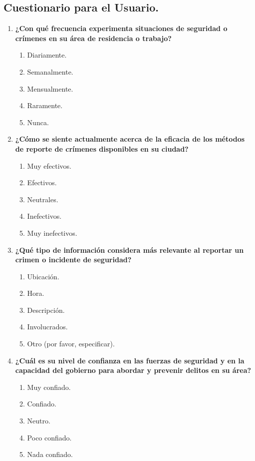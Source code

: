 \documentclass{article}
\begin{document}
    \subsection{Cuestionario para el Usuario.}
        \begin{enumerate}[label=\arabic*.]
            \item \textbf{¿Con qué frecuencia experimenta situaciones de seguridad o crímenes en su área de residencia o trabajo?}
                \begin{enumerate}[label=\alph*)]
                \item Diariamente.
                \item Semanalmente.
                \item Mensualmente.
                \item Raramente.
                \item Nunca.
                \end{enumerate}
            \item \textbf{¿Cómo se siente actualmente acerca de la eficacia de los métodos de reporte de crímenes disponibles en su ciudad?}
                \begin{enumerate}[label=\alph*.]
                    \item Muy efectivos.
                    \item Efectivos.
                    \item Neutrales.
                    \item Inefectivos.
                    \item Muy inefectivos.
                \end{enumerate}

            \item \textbf{¿Qué tipo de información considera más relevante al reportar un crimen o incidente de seguridad?}
                \begin{enumerate}[label=\alph*.]
                    \item Ubicación.
                    \item Hora.
                    \item Descripción.
                    \item Involucrados.
                    \item Otro (por favor, especificar).
                \end{enumerate}

            \item \textbf{¿Cuál es su nivel de confianza en las fuerzas de seguridad y en la capacidad del gobierno para abordar y prevenir delitos en su área?}
                \begin{enumerate}[label=\alph*.]
                    \item Muy confiado.
                    \item Confiado.
                    \item Neutro.
                    \item Poco confiado.
                    \item Nada confiado.
                \end{enumerate}


\end{enumerate}
\end{document}
